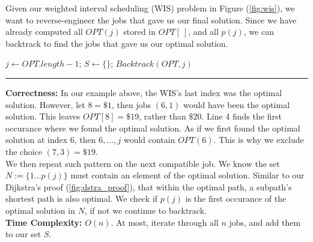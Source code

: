 \noindent
Given our weighted interval scheduling (WIS) problem in Figure (\ref{fig:wis}), we want to reverse-engineer the jobs that gave us
our final solution. Since we have already computed all $OPT(j)$ stored in $OPT[\ ]$, and all $p(j)$, we can backtrack
to find the jobs that gave us our optimal solution.

\begin{Func}
    \label{func:backtrack}
    \vspace{-.5em}
    \begin{algorithm}[H]
        \SetAlgoLined
        $j \gets OPT.length-1$; $S \gets \{\}$; 
        $Backtrack(OPT, j)$\;
    \end{algorithm}
    \noindent
    \rule{\textwidth}{0.4pt}
    \textbf{Correctness:} In our example above, the WIS's last index was the optimal solution. However, let $8=\$1$, then
    jobs $(6,1)$ would have been the optimal solution. This leaves $OPT[8]=\$19$, rather than $\$20$. Line 4 finds the first occurance where
    we found the optimal solution. As if we first found the optimal solution at index $6$, then $6,\dots,j$ would contain $OPT(6)$. This is why
    we exclude the choice $(7,3)=\$19$.\\

    \noindent
    We then repeat such pattern on the next compatible job. We know the set $N:=\{1\dots p(j)\}$ must contain an element of the optimal solution.
    Similar to our Dijkstra's proof (\ref{fig:dstra_proof}), that within the optimal path, a subpath's shortest path is also optimal. We check if
    $p(j)$ is the first occurance of the optimal solution in $N$, if not we continue to backtrack.\\

    \noindent
    \textbf{Time Complexity:} $O(n)$. At most, iterate through all $n$ jobs, and add them to our set $S$.
\end{Func}

\newpage
